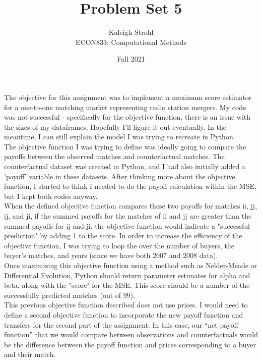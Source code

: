 \documentclass[a4paper,12pt]{article}
\begin{document}
\title{Problem Set 5}
\author{Kaleigh Strohl \\
ECON833: Computational Methods}
\date{Fall 2021}
\maketitle

\noindent The objective for this assignment was to implement a maximum score estimator for a one-to-one matching market representing radio station mergers. My code was not successful - specifically for the objective function, there is an issue with the sizes of my dataframes. Hopefully I'll figure it out eventually. In the meantime, I can still explain the model I was trying to recreate in Python. \\

\noindent The objective function I was trying to define was ideally going to compare the payoffs between the observed matches and counterfactual matches. The counterfactual dataset was created in Python, and I had also initially added a 'payoff' variable in these datasets. After thinking more about the objective function, I started to think I needed to do the payoff calculation within the MSE, but I kept both codes anyway. \\

\noindent When the defined objective function compares these two payoffs for matches ii, jj, ij, and ji, if the summed payoffs for the matches of ii and jj are greater than the summed payoffs for ij and ji, the objective function would indicate a "successful prediction" by adding 1 to the score. In order to increase the efficiency of the objective function, I was trying to loop the over the number of buyers, the buyer's matches, and years (since we have both 2007 and 2008 data). \\

\noindent Once maximizing this objective function using a method such as Nelder-Meade or Differential Evolution, Python should return parameter estimates for alpha and beta, along with the "score" for the MSE. This score should be a number of the successfully predicted matches (out of 99). \\

\noindent This previous objective function described does not use prices. I would need to define a second objective function to incorporate the new payoff function and transfers for the second part of the assignment. In this case, our \enquote{net payoff function} that we would compare between observations and counterfactuals would be the difference between the payoff function and prices corresponding to a buyer and their match. \\
\end{document}
